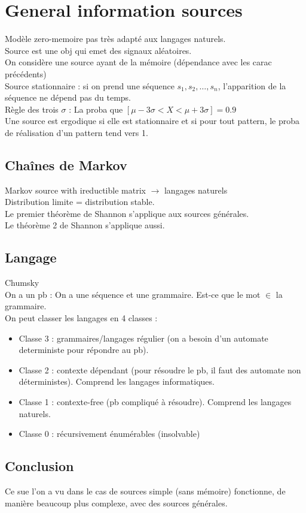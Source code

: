 \section{General information sources}
Modèle zero-memoire pas très adapté aux langages naturels.\\
Source est une obj qui emet des signaux aléatoires.\\
On considère une source ayant de la mémoire (dépendance avec les carac précédents)\\
Source stationnaire : si on prend une séquence $s_1, s_2, \ldots, s_n$, l'apparition de la séquence ne dépend pas du temps.\\
Règle des trois $\sigma$ : La proba que $[\mu - 3\sigma < X < \mu + 3\sigma]=0.9$\\
Une source est ergodique si elle est stationnaire et si pour tout pattern, le proba de réalisation d'un pattern tend vers 1.\\
\subsection{Chaînes de Markov}
Markov source with ireductible matrix $\rightarrow$ langages naturels\\
Distribution limite = distribution stable.\\
Le premier théorème de Shannon s'applique aux sources générales.\\
Le théorème 2 de Shannon s'applique aussi.\\

\subsection{Langage}
Chumsky\\
On a un pb : On a une séquence et une grammaire. Est-ce que le mot $\in$ la grammaire.\\
On peut classer les langages en 4 classes :
\begin{itemize}
 \item Classe 3 : grammaires/langages régulier (on a besoin d'un automate deterministe pour répondre au pb).
 \item Classe 2 : contexte dépendant (pour résoudre le pb, il faut des automate non déterministes). Comprend les langages informatiques.
 \item Classe 1 : contexte-free (pb compliqué à résoudre). Comprend les langages naturels.
 \item Classe 0 : récursivement énumérables (insolvable)
\end{itemize}
\subsection{Conclusion}
Ce sue l'on a vu dans le cas de sources simple (sans mémoire) fonctionne, de manière beaucoup plus complexe, avec des sources générales.